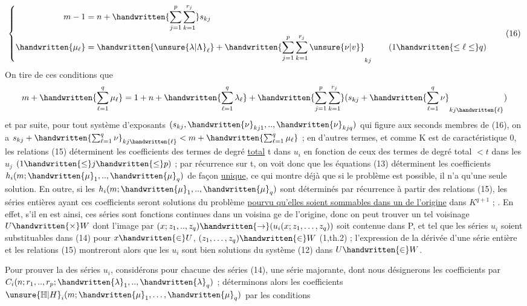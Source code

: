 \[
\left\{\begin{aligned}
m-1&=n+\handwritten{\sum_{j=1}^p\sum_{k=1}^{r_j}}s_{kj}\\
\handwritten{\mu_\ell}&=\handwritten{\unsure{\lambda|\Lambda}_\ell}+\handwritten{\sum_{j=1}^p\sum_{k=1}^{r_j}\unsure{\nu|v}}_{kj}\qquad(1\handwritten{\leq\ell\leq}q)
\end{aligned}\right.\tag*{(16)}
\]
On tire de ces conditions que
\[
m+\handwritten{\sum_{\ell=1}^q\mu_\ell}=1+n+\handwritten{\sum_{\ell=1}^q\lambda_\ell}+\handwritten{\sum_{j=1}^p\sum_{k=1}^{r_j}}(s_{kj}+\handwritten{\sum_{\ell=1}^q\nu}_{kj\handwritten{\ell}})
\]
et par suite, pour tout système d'exposants $(s_{kj},\handwritten{\nu}_{kj1},..,\handwritten{\nu}_{kjq})$ qui figure aux seconds membres de (16), on a $s_{kj}+\handwritten{\sum_{\ell=1}^q\nu}_{kj\handwritten{\ell}}<m+\handwritten{\sum_{\ell=1}^q\mu_\ell}$ ; en d'autres termes, et comme K est de caractéristique 0, les relations (15) déterminent les coefficients des termes de degré \uline{total} t dans $u_i$ en fonction de ceux des termes de degré total $<t$ dans les $u_j$ $(1\handwritten{\leq}j\handwritten{\leq}p)$ ; par récurrence sur t, on voit donc que les équations (13) déterminent les coefficients $h_i(m;\handwritten{\mu}_1,..,\handwritten{\mu}_q)$ de fa\handwritten{-}çon \uline{unique}, ce qui montre déjà que si le problème est possible, il n'a qu'une seule solution. En outre, si les $h_i(m;\handwritten{\mu}_1,..,\handwritten{\mu}_q)$ sont déterminés par récurrence à partir des relations (15), les séries entières ayant ces coefficients seront solutions du problème \uline{pourvu qu'elles soient sommables dans un de l'origine} dans $K^{q+1}$ ; . En effet, s'il en est ainsi, ces séries sont fonctions continues dans un voisina ge de l'origine, donc on peut trouver un tel voisinage $U\handwritten{\times}W$ dont l'image par $(x;z_1,..,z_q)\handwritten{\to}(u_i(x;z_1,\ldots,z_q))$ soit contenue dans P, et tel que les séries $u_i$ soient substituables dans (14) pour $x\handwritten{\in}U$, $(z_1,\ldots,z_q)\handwritten{\in}W$ (\handwritten{\S}1,th.2) ; l'expression de la dérivée d'une série entière et les relations (15) montreront alors que les $u_i$ sont bien solutions du système (12) dans $U\handwritten{\in}W$.

Pour prouver la  des séries $u_i$, considérons pour chacune des séries (14), une série majorante, dont nous désignerons les coefficients par $C_i(n;r_1,..,r_p;\handwritten{\lambda}_1,..,\handwritten{\lambda}_q)$ ; déterminons alors les coefficients $\unsure{\mathbb{H}|H}_i(m;\handwritten{\mu}_1,\ldots,\handwritten{\mu}_q)$ par les conditions


